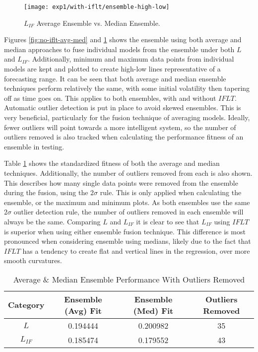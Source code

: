 \documentclass[12pt, letterpaper]{article}
\begin{document}
\begin{figure}[!htb]
\begin{center}
\texttt{[image: exp1/with-iflt/ensemble-high-low]}
\end{center}
\caption{ $L_{IF}$ Average Ensemble vs. Median Ensemble.}
\label{fig:with-iflt-avg-med}
\end{figure}

\textrm{ \indent Figures \ref{fig:no-iflt-avg-med} and \ref{fig:with-iflt-avg-med} shows the ensemble using both average and median approaches to fuse individual models from the ensemble under both $L$ and $L_{IF}$. Additionally, minimum and maximum data points from individual models are kept and plotted to create high-low lines representative of a forecasting range. It can be seen that both average and median ensemble techniques perform relatively the same, with some initial volatility then tapering off as time goes on. This applies to both ensembles, with and without $IFLT$. Automatic outlier detection is put in place to avoid skewed ensembles. This is very beneficial, particularly for the fusion technique of averaging models. Ideally, fewer outliers will point towards a more intelligent system, so the number of outliers removed is also tracked when calculating the performance fitness of an ensemble in testing. }

\textrm{\indent Table \ref{no-iflt-ens-stats} shows the standardized fitness of both the average and median techniques. Additionally, the number of outliers removed from each is also shown. This describes how many single data points were removed from the ensemble during the fusion, using the $2\sigma$ rule. This is only applied when calculating the ensemble, or the maximum and minimum plots. As both ensembles use the same $2\sigma$ outlier detection rule, the number of outliers removed in each ensemble will always be the same. Comparing $L$ and $L_{IF}$ it is clear to see that $L_{IF}$ using $IFLT$ is superior when using either ensemble fusion technique. This difference is most pronounced when considering ensemble using medians, likely due to the fact that $IFLT$ has a tendency to create flat and vertical lines in the regression, over more smooth curvatures. }

\begin{table}[!ht]
\centering
\begin{tabular}{||c|c|c|c||}
\hline
\textbf{Category} & \textbf{Ensemble (Avg) Fit} & \textbf{Ensemble (Med) Fit} & \textbf{Outliers Removed} \\
\hline
$L$ & 0.194444 & 0.200982 & 35 \\
\hline
$L_{IF}$ & 0.185474  & 0.179552 & 43 \\
\hline
\end{tabular}
\caption{Average \& Median Ensemble Performance With Outliers Removed}
\label{no-iflt-ens-stats}
\end{table}
\end{document}
